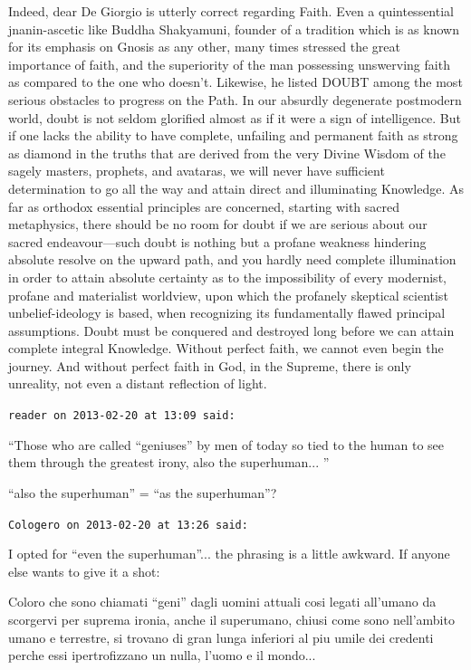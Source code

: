 \begin{footnotesize}
\begin{sffamily}
Indeed, dear De Giorgio is utterly correct regarding Faith. Even a quintessential jnanin-ascetic like Buddha Shakyamuni, founder of a tradition which is as known for its emphasis on Gnosis as any other, many times stressed the great importance of faith, and the superiority of the man possessing unswerving faith as compared to the one who doesn't. Likewise, he listed DOUBT among the most serious obstacles to progress on the Path. In our absurdly degenerate postmodern world, doubt is not seldom glorified almost as if it were a sign of intelligence. But if one lacks the ability to have complete, unfailing and permanent faith as strong as diamond in the truths that are derived from the very Divine Wisdom of the sagely masters, prophets, and avataras, we will never have sufficient determination to go all the way and attain direct and illuminating Knowledge. As far as orthodox essential principles are concerned, starting with sacred metaphysics, there should be no room for doubt if we are serious about our sacred endeavour---such doubt is nothing but a profane weakness hindering absolute resolve on the upward path, and you hardly need complete illumination in order to attain absolute certainty as to the impossibility of every modernist, profane and materialist worldview, upon which the profanely skeptical scientist unbelief-ideology is based, when recognizing its fundamentally flawed principal assumptions. Doubt must be conquered and destroyed long before we can attain complete integral Knowledge. Without perfect faith, we cannot even begin the journey. And without perfect faith in God, in the Supreme, there is only unreality, not even a distant reflection of light.

\texttt{reader on 2013-02-20 at 13:09 said:}

``Those who are called ``geniuses'' by men of today so tied to the human to see them through the greatest irony, also the superhuman... ''

``also the superhuman'' = ``as the superhuman''?

\hfill

\texttt{Cologero on 2013-02-20 at 13:26 said:}

I opted for ``even the superhuman''... the phrasing is a little awkward. If anyone else wants to give it a shot:

Coloro che sono chiamati ``geni'' dagli uomini attuali cosi legati all'umano da scorgervi per suprema ironia, anche il superumano, chiusi come sono nell'ambito umano e terrestre, si trovano di gran lunga inferiori al piu umile dei credenti perche essi ipertrofizzano un nulla, l'uomo e il mondo...

\end{sffamily}
\end{footnotesize}

